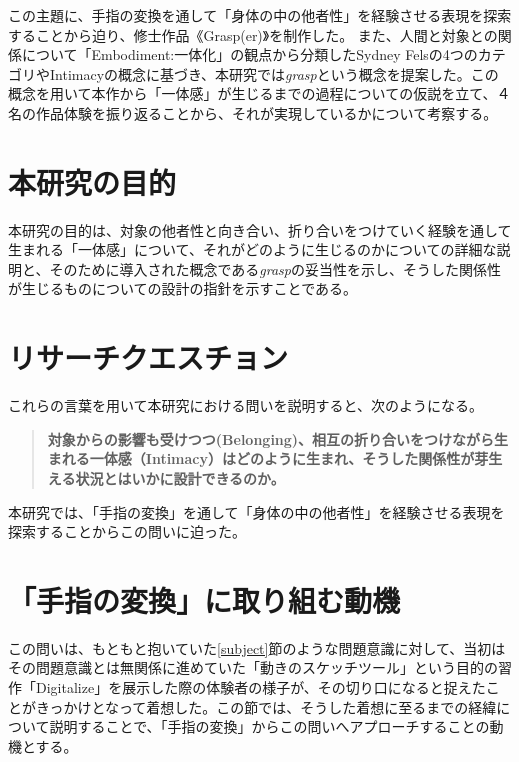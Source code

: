 この主題に、手指の変換を通して「身体の中の他者性」を経験させる表現を探索することから迫り、修士作品《Grasp(er)》を制作した。
また、人間と対象との関係について「Embodiment:一体化」の観点から分類したSydney Felsの4つのカテゴリやIntimacyの概念に基づき、本研究では\textit{grasp}という概念を提案した。この概念を用いて本作から「一体感」が生じるまでの過程についての仮説を立て、４名の作品体験を振り返ることから、それが実現しているかについて考察する。

\section{本研究の目的}
本研究の目的は、対象の他者性と向き合い、折り合いをつけていく経験を通して生まれる「一体感」について、それがどのように生じるのかについての詳細な説明と、そのために導入された概念である\textit{grasp}の妥当性を示し、そうした関係性が生じるものについての設計の指針を示すことである。

\section{リサーチクエスチョン}

これらの言葉を用いて本研究における問いを説明すると、次のようになる。

\begin{quote}
\textbf{対象からの影響も受けつつ(Belonging)、相互の折り合いをつけながら生まれる一体感（Intimacy）はどのように生まれ、そうした関係性が芽生える状況とはいかに設計できるのか。}
\end{quote}

本研究では、「手指の変換」を通して「身体の中の他者性」を経験させる表現を探索することからこの問いに迫った。


\section{「手指の変換」に取り組む動機}
\label{prototyping_concept_making}
この問いは、もともと抱いていた\ref{subject}節のような問題意識に対して、当初はその問題意識とは無関係に進めていた「動きのスケッチツール」という目的の習作「Digitalize」を展示した際の体験者の様子が、その切り口になると捉えたことがきっかけとなって着想した。この節では、そうした着想に至るまでの経緯について説明することで、「手指の変換」からこの問いへアプローチすることの動機とする。

